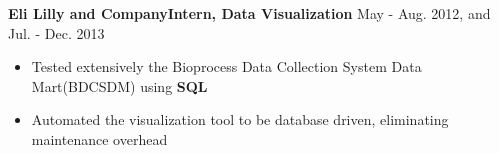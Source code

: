 \documentclass[10.5pt]{res} %
\begin{document}
\begin{resume}
    \textbf{Eli Lilly and Company}\quad\quad \textbf{Intern, Data Visualization  %
    }\hfill May - Aug. 2012, and Jul. - Dec. 2013
    \begin{itemize} pt
    	\item Tested extensively the Bioprocess Data Collection System Data Mart(BDCSDM) using \textbf{SQL} %
    	\item  Automated the visualization tool to be database driven, eliminating maintenance overhead %

\end{itemize}
\end{resume}
\end{document}
